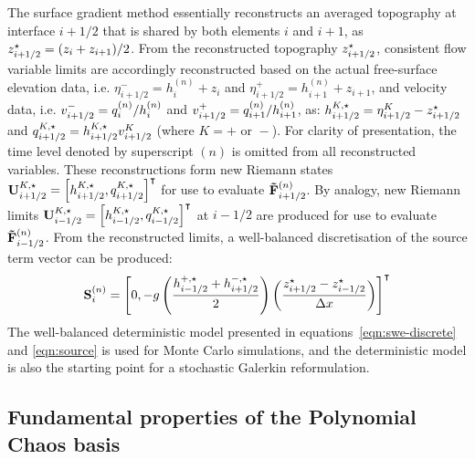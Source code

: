 The surface gradient method essentially reconstructs an averaged topography at interface $i+1/2$ that is shared by both elements $i$ and $i+1$, as $z^\star_{i+1/2} = (z_i + z_{i+1})/2$.
From the reconstructed topography $z^\star_{i+1/2}$, consistent flow variable limits are accordingly reconstructed based on the actual free-surface elevation data, i.e. $\eta_{i+1/2}^- = h_i^{(n)} + z_i$ and $\eta_{i+1/2}^+ = h_{i+1}^{(n)} + z_{i+1}$, and velocity data, i.e. $v_{i+1/2}^- = q_i^{(n)}/h_i^{(n)}$ and $v_{i+1/2}^+ = q_{i+1}^{(n)} / h_{i+1}^{(n)}$, as: $h^{K,\star}_{i+1/2} = \eta_{i+1/2}^K - z^\star_{i+1/2}$ and $q^{K,\star}_{i+1/2} = h^{K,\star}_{i+1/2} v_{i+1/2}^K$ (where $K = + \text{ or } -$).
For clarity of presentation, the time level denoted by superscript $(n)$ is omitted from all reconstructed variables.
These reconstructions form new Riemann states $\mathbf{U}^{K,\star}_{i+1/2} = \left[ h^{K,\star}_{i+1/2}, q^{K,\star}_{i+1/2} \right]^\intercal$ for use to evaluate $\mathbf{\tilde{F}}_{i+1/2}^{(n)}$.
By analogy, new Riemann limits $\mathbf{U}^{K,\star}_{i-1/2} = \left[ h^{K,\star}_{i-1/2}, q^{K,\star}_{i-1/2} \right]^\intercal$ at $i - 1/2$ are produced for use to evaluate $\mathbf{\tilde{F}}_{i-1/2}^{(n)}$.
From the reconstructed limits, a well-balanced discretisation of the source term vector can be produced:
\begin{align}
	\mathbf{S}_i^{(n)} = \left[ 0, -g
	\left( \frac{h^{+,\star}_{i-1/2} + h^{-,\star}_{i+1/2}}{2} \right)
	\left( \frac{z^\star_{i+1/2} - z^\star_{i-1/2}}{\Delta x} \right)
	\right]^\intercal
	\label{eqn:source}
\end{align}
The well-balanced deterministic model presented in equations~\eqref{eqn:swe-discrete} and \eqref{eqn:source} is used for Monte Carlo simulations, and the deterministic model is also the starting point for a stochastic Galerkin reformulation.

\subsection{Fundamental properties of the Polynomial Chaos basis}

